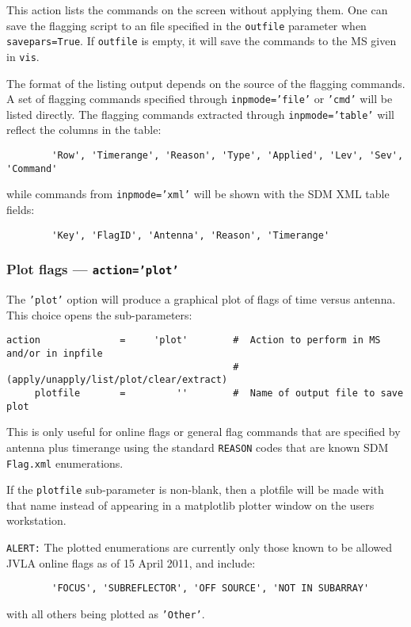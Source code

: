 This action lists the commands on the screen without applying
them. One can save the flagging script to an file specified in the
{\tt outfile} parameter when {\tt savepars=True}. If {\tt outfile} is
empty, it will save the commands to the MS given in {\tt vis}.



The format of the listing output depends on the source of the flagging
commands. A set of flagging commands specified through 
{\tt inpmode='file'} or {\tt 'cmd'} will be listed directly. The
flagging commands extracted through {\tt inpmode='table'} will
reflect the columns in the table:
\begin{verbatim}
        'Row', 'Timerange', 'Reason', 'Type', 'Applied', 'Lev', 'Sev', 'Command'
\end{verbatim}
while commands from {\tt inpmode='xml'} will be shown with the SDM
XML table fields:
\begin{verbatim}
        'Key', 'FlagID', 'Antenna', 'Reason', 'Timerange'
\end{verbatim}



\subsubsection{Plot flags --- {\tt action='plot'}}
\label{section:edit.flagcmd.action.plot}

The {\tt 'plot'} option will produce a graphical plot of flags of time versus antenna.
This choice opens the sub-parameters:
\small
\begin{verbatim}
action              =     'plot'        #  Action to perform in MS and/or in inpfile
                                        #   (apply/unapply/list/plot/clear/extract)
     plotfile       =         ''        #  Name of output file to save plot
\end{verbatim}
\normalsize
This is only useful for online flags or general flag commands that are
specified by antenna plus timerange using the standard {\tt REASON}
codes that are known SDM {\tt Flag.xml} enumerations.

If the {\tt plotfile} sub-parameter is non-blank, then a plotfile will
be made with that name instead of appearing in a matplotlib plotter window
on the users workstation.

{\tt ALERT:} The plotted enumerations are currently only those known
to be allowed JVLA online flags as of 15 April 2011, and include:
\begin{verbatim}
        'FOCUS', 'SUBREFLECTOR', 'OFF SOURCE', 'NOT IN SUBARRAY'
\end{verbatim}
with all others being plotted as {\tt 'Other'}.

